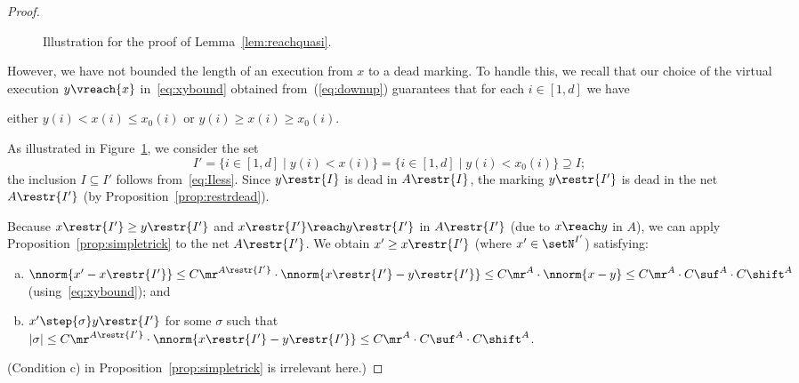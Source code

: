 \begin{proof}
\begin{figure}[t]
\begin{center}
\end{center}
\caption{Illustration for the proof of
	Lemma~\ref{lem:reachquasi}.}\label{fig:markingstwo}
\end{figure}
	

\noindent
	However,
	we have not bounded the length of an execution from $x$ to a
	dead marking.
	To handle this, we recall that our choice of 
	the virtual execution $y\vreach{x}$ in~\eqref{eq:xybound} obtained
	from~(\ref{eq:downup}) guarantees that
	for each $i\in[1,d]$ we have
\begin{center}
either $y(i)< x(i)\leq x_0(i)$ or $y(i)\geq x(i)\geq x_0(i)$. 
\end{center}
	As illustrated in Figure~\ref{fig:markingstwo},
we consider the set
\[I'=\{i\in[1,d]\mid y(i)< x(i)\}=\{i\in[1,d]\mid y(i)<
	x_0(i)\}\supseteq I;\] 
	the inclusion $I\subseteq I'$ follows from~\eqref{eq:Iless}.
	 Since
	$y\restr{I}$ is dead in $A\restr{I}$, the marking 
$y\restr{I'}$ is dead in the net $A\restr{I'}$ (by
Proposition~\ref{prop:restrdead}). 

Because $x\restr{I'}\geq y\restr{I'}$ and  $x\restr{I'}\reach
y\restr{I'}$ in  $A\restr{I'}$ (due to $x\reach y$ in  $A$),
we can apply Proposition~\ref{prop:simpletrick} to the net
$A\restr{I'}$. We obtain  $x'\geq
x\restr{I'}$ (where $x'\in\setN^{I'}$) satisfying:
\begin{enumerate}[a)]
	\item 
$\nnorm{x'-x\restr{I'}}\leq 
		C\mr^{A\restr{I'}}\cdot
		\nnorm{x\restr{I'}-y\restr{I'}}\leq C\mr^{A}\cdot
		\nnorm{x-y}\leq  C\mr^{A}\cdot C\suf^A\cdot C\shift^A$
		(using~\eqref{eq:xybound}); and
		\item
			$x'\step{\sigma}y\restr{I'}$ for some $\sigma$ 
			such that $|\sigma|\leq C\mr^{A\restr{I'}}\cdot
	\nnorm{x\restr{I'}-y\restr{I'}}\leq C\mr^{A}\cdot C\suf^A\cdot C\shift^A$.
	\end{enumerate}
(Condition c) in Proposition~\ref{prop:simpletrick} is irrelevant
here.)


\end{proof}

